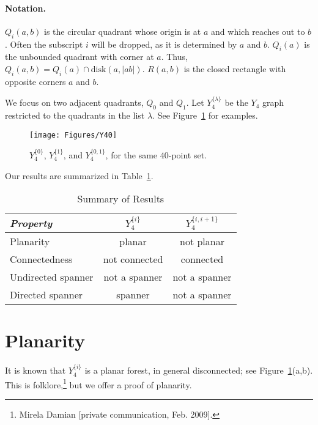 \pdfoutput=1  \documentclass[]{article}
\newcommand{\tablab}[1]{\label{tab:#1}}
\newcommand{\figlab}[1]{\label{fig:#1}}
\newcommand{\figref}[1]{\ref{fig:#1}}
\newcommand{\tabref}[1]{\ref{tab:#1}}
\begin{document}
\paragraph{Notation.}
$Q_i(a,b)$ is the circular quadrant whose origin is at $a$ and which reaches out to $b$.
Often the subscript $i$ will be dropped, as it is determined by $a$ and $b$.
$Q_i(a)$ is the unbounded quadrant with corner at $a$.
Thus,
$Q_i(a,b) = Q_i(a) \cap \mathrm{disk}(a, |ab|)$.
$R(a,b)$ is the closed rectangle with opposite corners $a$ and $b$.


We focus on two adjacent quadrants, $Q_0$ and $Q_1$.
Let $Y_4^{\{\lambda\}}$ be the $Y_4$ graph restricted to the 
quadrants in the list $\lambda$.
See Figure~\figref{Y40} for examples.
\begin{figure}[htbp]
\centering
\texttt{[image: Figures/Y40]}
\caption{$Y_4^{\{0\}}$, $Y_4^{\{1\}}$, and $Y_4^{\{0,1\}}$, for the same $40$-point set.}
\figlab{Y40}
\end{figure}


Our results are summarized in Table~\tabref{Results}.
\begin{table}[htbp]
\begin{center}
\begin{tabular}{| l || c | c |}
\hline
\emph{Property} & $Y_4^{\{i\}}$ & $Y_4^{\{i,i+1\}}$ 
\\ \hline \hline
Planarity & planar & not planar
\\ \hline
Connectedness & not connected & connected 
\\ \hline
Undirected spanner & not a spanner & not a spanner 
\\ \hline
Directed spanner & spanner & not a spanner
\\ \hline
\end{tabular}
\end{center}
\tablab{Results}
\caption{Summary of Results}
\end{table}

\section{Planarity}
It is known that $Y_4^{\{i\}}$ is a planar forest, in general disconnected;
see Figure~\figref{Y40}(a,b).
This is folklore,\footnote{
Mirela Damian [private communication, Feb. 2009].
}
but we offer a proof of planarity.
\end{document}
